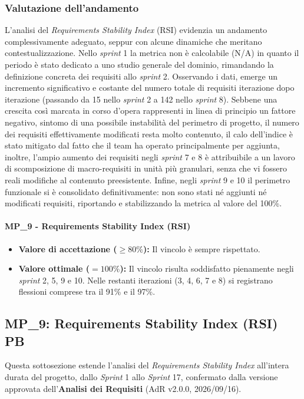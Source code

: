 \documentclass[12pt, a4paper]{article}
\begin{document}
\subsubsection*{Valutazione dell'andamento}
L'analisi del \textit{Requirements Stability Index} (RSI) evidenzia un andamento complessivamente adeguato, seppur con alcune dinamiche che meritano contestualizzazione. Nello \textit{sprint} 1 la metrica non è calcolabile (N/A) in quanto il periodo è stato dedicato a uno studio generale del dominio, rimandando la definizione concreta dei requisiti allo \textit{sprint} 2.
Osservando i dati, emerge un incremento significativo e costante del numero totale di requisiti iterazione dopo iterazione (passando da 15 nello \textit{sprint} 2 a 142 nello \textit{sprint} 8). Sebbene una crescita così marcata in corso d'opera rappresenti in linea di principio un fattore negativo, sintomo di una possibile instabilità del perimetro di progetto, il numero dei requisiti effettivamente modificati resta molto contenuto, il calo dell'indice è stato mitigato dal fatto che il team ha operato principalmente per aggiunta, inoltre, l'ampio aumento dei requisiti negli \textit{sprint} 7 e 8 è attribuibile a un lavoro di scomposizione di macro-requisiti in unità più granulari, senza che vi fossero reali modifiche al contenuto preesistente. Infine, negli \textit{sprint} 9 e 10 il perimetro funzionale si è consolidato definitivamente: non sono stati né aggiunti né modificati requisiti, riportando e stabilizzando la metrica al valore del 100\%.

\paragraph*{MP\_9 - Requirements Stability Index (RSI)}
\begin{itemize}
    \item \textbf{Valore di accettazione ($\ge 80\%$):} Il vincolo è sempre rispettato.
    \item \textbf{Valore ottimale ($= 100\%$):} Il vincolo risulta soddisfatto pienamente negli \textit{sprint} 2, 5, 9 e 10. Nelle restanti iterazioni (3, 4, 6, 7 e 8) si registrano flessioni comprese tra il 91\% e il 97\%.
\end{itemize}

\subsection{MP\_9: Requirements Stability Index (RSI) PB}
Questa sottosezione estende l'analisi del \textit{Requirements Stability Index} all'intera durata del progetto, dallo \textit{Sprint} 1 allo \textit{Sprint} 17, confermato dalla versione approvata dell'\textbf{Analisi dei Requisiti} (AdR v2.0.0, 2026/09/16).
\end{document}
